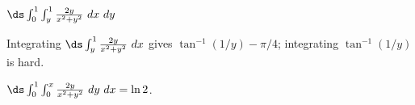 {$\ds \int_0^{1}\int_y^{1} \frac{2y}{x^2+y^2}\ dx\ dy$
}
{Integrating $\ds\int_y^{1}\frac{2y}{x^2+y^2}\ dx$ gives $\tan^{-1}(1/y)-\pi/4$; integrating $\tan^{-1}(1/y)$ is hard.

$\ds\int_0^1\int_0^x\frac{2y}{x^2+y^2}\ dy \ dx = \ln 2$.
}
